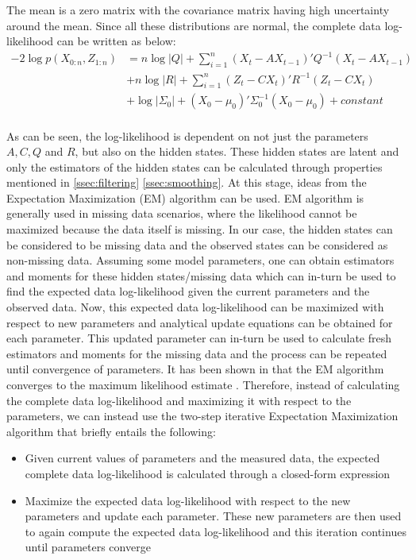 \documentclass{article}
\begin{document}
The mean is a zero matrix with the covariance matrix having high uncertainty around the mean. Since all these distributions are normal, the complete data log-likelihood can be written as below:
\begin{equation} \label{eq:21}
\begin{split}
     -2\log p(X_{0:n},Z_{1:n}) &=n\log |Q| +\sum_{i=1}^n(X_t-AX_{t-1})'Q^{-1}(X_t-AX_{t-1})  \\ 
 & +n\log |R|+\sum_{i=1}^n(Z_t-CX_t)'R^{-1}(Z_t-CX_t)\\
 & + \log|\Sigma_0| + (X_0-\mu_0)'\Sigma_0^{-1}(X_0-\mu_0) + constant\\
\end{split}
\end{equation}

As can be seen, the log-likelihood is dependent on not just the parameters $A,C, Q$ and $R$, but also on the hidden states. These hidden states are latent and only the estimators of the hidden states can be calculated through properties mentioned in \ref{ssec:filtering} \ref{ssec:smoothing}. At this stage, ideas from the Expectation Maximization (EM) \cite{dempster_maximum_1977} algorithm can be used. EM algorithm is generally used in missing data scenarios, where the likelihood cannot be maximized because the data itself is missing.  In our case, the hidden states can be considered to be missing data and the observed states can be considered as non-missing data. Assuming some model parameters, one can obtain estimators and moments for these hidden states/missing data which can in-turn be used to find the expected data log-likelihood given the current parameters and the observed data. Now, this expected data log-likelihood can be maximized with respect to new parameters and analytical update equations can be obtained for each parameter. This updated parameter can in-turn be used to calculate fresh estimators and moments for the missing data and the process can be repeated until convergence of parameters. It has been shown in \cite{dempster_maximum_1977} that the EM algorithm converges to the maximum likelihood estimate . Therefore, instead of calculating the complete data log-likelihood and maximizing it with respect to the parameters, we can instead use the two-step iterative Expectation Maximization algorithm that briefly entails the following:
\begin{itemize}
    \item Given current values of parameters and the measured data, the expected complete data log-likelihood is calculated through a closed-form expression
    \item Maximize the expected data log-likelihood with respect to the new parameters and update each parameter. These new parameters are then used to again compute the expected data log-likelihood and this iteration continues until parameters converge
\end{itemize}
\end{document}
